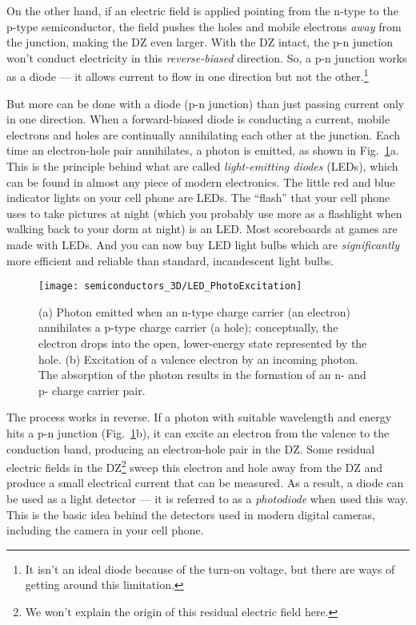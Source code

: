 On the other hand, if an electric field is applied pointing from the
n-type to the p-type semiconductor, the field pushes the holes and
mobile electrons {\it away} from the junction, making the DZ even
larger. With the DZ intact, the p-n junction won't conduct electricity
in this {\it reverse-biased} direction. So, a p-n junction works as
a diode --- it allows current to flow in one direction but
not the other.\footnote{It isn't an ideal diode because of the turn-on voltage,
but there are ways of getting around this limitation.}

But more can be done with a diode (p-n junction) than just passing
current only in one direction. When a forward-biased diode is conducting
a current, mobile electrons and holes are continually annihilating each
other at the junction. Each time an electron-hole pair annihilates,
a photon is emitted, as shown in Fig.~\ref{fig:LED_PhotoExcitation}a.
This is the principle behind what are called {\it light-emitting
diodes} (LEDs), which can be found in almost any piece of modern
electronics. The little red and blue indicator lights on your cell phone
are LEDs. The ``flash'' that your cell phone uses to take pictures at
night (which you probably use more as a flashlight when walking back
to your dorm at night) is an LED. Most scoreboards at games are made with
LEDs.  And you can now buy LED light bulbs which are {\it significantly}
more efficient and reliable than standard, incandescent light bulbs.

\begin{figure}
\begin{center}
\texttt{[image: semiconductors\_3D/LED\_PhotoExcitation]}
\end{center} 
\caption{(a) Photon emitted when an n-type charge carrier (an electron)
annihilates a p-type charge carrier (a hole); conceptually, the electron
drops into the open, lower-energy state represented by the hole.
(b) Excitation of a valence electron by an incoming photon. 
The absorption of the photon results in the formation of an  n- 
and p- charge carrier pair. 
} 
\label{fig:LED_PhotoExcitation} 
\end{figure}

The process works in reverse. If a photon with suitable wavelength and
energy hits a p-n junction (Fig.~\ref{fig:LED_PhotoExcitation}b), it 
can excite an electron from the
valence to the conduction band, producing an electron-hole
pair in the DZ. Some residual electric fields in the DZ\footnote{We won't
explain the origin of this residual electric field here.} sweep this
electron and hole away from the DZ and produce a small electrical current
that can be measured. As a result, a diode can be used as a light
detector --- it is referred to as a {\it photodiode} when used this
way. This is the basic idea behind the detectors used in modern
digital cameras, including the camera in your cell phone.


